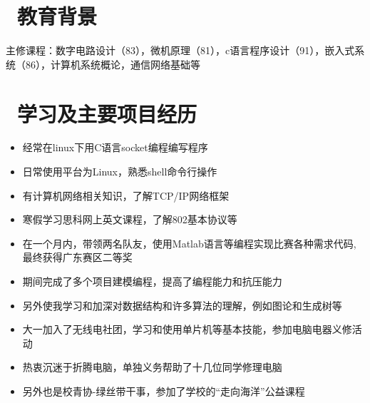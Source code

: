 \documentclass{resume}
\begin{document}

 
\section{\faGraduationCap\  教育背景}

主修课程：数字电路设计（83），{}{}微机原理（81），c语言程序设计（91），嵌入式系统（86），计算机系统概论，通信网络基础等
\section{\faUsers\ 学习及主要项目经历}
\begin{onehalfspacing}
\begin{itemize}
  \item 经常在linux下用C语言socket编程编写程序
  \item 日常使用平台为Linux，熟悉shell命令行操作
  \item 有计算机网络相关知识，了解TCP/IP网络框架
  \item 寒假学习思科网上英文课程，了解802基本协议等
  
\end{itemize}

\begin{onehalfspacing}
\begin{itemize}
  \item 在一个月内，带领两名队友，使用Matlab语言等编程实现比赛各种需求代码,\\最终获得广东赛区二等奖
  \item 期间完成了多个项目建模编程，提高了编程能力和抗压能力
  \item 另外使我学习和加深对数据结构和许多算法的理解，例如图论和生成树等
\end{itemize}
\end{onehalfspacing}
\begin{itemize}
  \item 大一加入了无线电社团，学习和使用单片机等基本技能，参加电脑电器义修活动
  \item 热衷沉迷于折腾电脑，单独义务帮助了十几位同学修理电脑
  \item 另外也是校青协-绿丝带干事，参加了学校的“走向海洋”公益课程
\end{itemize}



\end{onehalfspacing}
\end{document}
